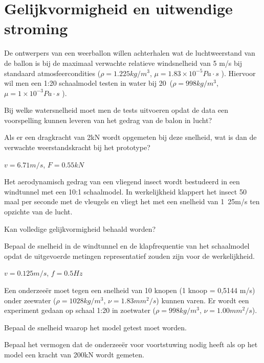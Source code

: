 \FloatBarrier
\chapter{Gelijkvormigheid en uitwendige stroming}
\label{sec:Gelijkvormigheid}
	\begin{toepassing}
		\label{weerballon}
		De ontwerpers van een weerballon willen achterhalen wat de luchtweerstand van de ballon is bij de maximaal verwachte relatieve windsnelheid van 5 m/s bij standaard atmosfeercondities ($\rho = \unit{1.225}{kg/m^3}$, $\mu = \unit{1.83\times 10^{-5}}{Pa \cdot s}$ ).
		Hiervoor wil men een 1:20 schaalmodel testen in water bij 20\textcelsius\ ($\rho = \unit{998}{kg/m^3}$, $\mu = \unit{1\times 10^{-3}}{Pa \cdot s}$ ). 
		
		Bij welke watersnelheid moet men de tests uitvoeren opdat de data een voorspelling kunnen leveren van het gedrag van de balon in lucht? 
		
		Als er een dragkracht van \unit{2}{kN} wordt opgemeten bij deze snelheid, wat is dan de verwachte weerstandskracht bij het prototype?
	\end{toepassing}
	\begin{antwoord}
		$v = \unit{6.71}{m/s}$, $F = \unit{0.55}{kN}$
	\end{antwoord}
	\begin{toepassing}
		\label{insect}
		Het aerodynamisch gedrag van een vliegend insect wordt bestudeerd in een windtunnel met een 10:1 schaalmodel. In werkelijkheid klappert het insect 50 maal per seconde met de vleugels en vliegt het met een snelheid van \unit{1.25}{m/s} ten opzichte van de lucht. 
		
		Kan volledige gelijkvormigheid behaald worden?
		
		Bepaal de snelheid in de windtunnel en de klapfrequentie van het schaalmodel opdat de uitgevoerde metingen representatief zouden zijn voor de werkelijkheid.
	\end{toepassing}
	\begin{antwoord}
		$v = \unit{0.125}{m/s}$, $f = \unit{0.5}{Hz}$
	\end{antwoord}
	\begin{toepassing}	
		\label{onderzeeer}	
		Een onderzeeër moet tegen een snelheid van 10 knopen (1 knoop = 0,5144 m/s) onder zeewater ($\rho = \unit{1028}{kg/m^3}$, $\nu = \unit{1.83}{mm^2/s}$) kunnen varen. Er wordt een experiment gedaan op schaal 1:20 in zoetwater ($\rho = \unit{998}{kg/m^3}$, $\nu = \unit{1.00}{mm^2/s}$).
		
		Bepaal de snelheid waarop het model getest moet worden.
		
		Bepaal het vermogen dat de onderzeeër voor voortstuwing nodig heeft als op het model een kracht van \unit{200}{kN} wordt gemeten.
	\end{toepassing}
